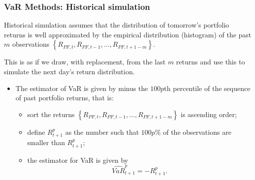 \begin{frame}%

\frametitle{VaR Methods: Historical simulation}

Historical simulation assumes that the distribution of tomorrow's portfolio
returns is well approximated by the empirical distribution (histogram) of
the past $m$ observations $\left\{
R_{PF,t},R_{PF,t-1},\ldots,R_{PF,t+1-m}\right\} $.

This is as if we draw, with replacement, from the last $m$ returns and use
this to simulate the next day's return distribution.

\begin{itemize}
\item The estimator of VaR is given by minus the $100p$th percentile of the
sequence of past portfolio returns, that is:

\begin{itemize}
\item sort the returns $\left\{ R_{PF,t},R_{PF,t-1},...,R_{PF,t+1-m}\right\}$
is ascending order;

\item define $R_{t+1}^{p}$ as the number such that $100p\%$ of the
observations are smaller than $R_{t+1}^{p}$;

\item the estimator for VaR is given by
\begin{equation*}
\widehat{VaR}_{t+1}^{p}=-R_{t+1}^{p}.
\end{equation*}
\end{itemize}

\end{itemize}

\end{frame}%

